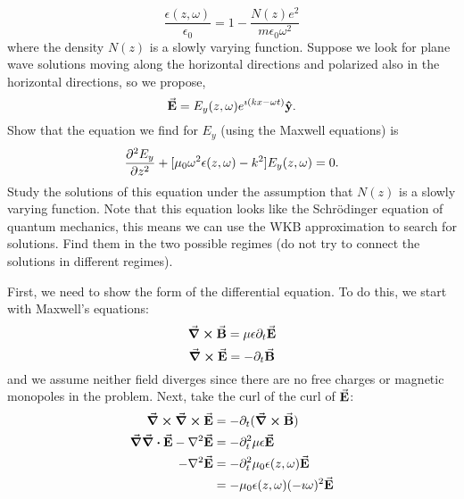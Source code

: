\documentclass[a4paper,twoside]{article}
\begin{document}
\begin{itemize}
        \begin{equation}
            \frac{\epsilon(z, \omega)}{\epsilon_0} = 1 - \frac{N(z) e^2}{m \epsilon_0 \omega^2}
        \end{equation}
        where the density $ N(z) $  is a slowly varying function. Suppose we look for plane wave solutions moving along the horizontal directions and polarized also in the horizontal directions, so we propose,
        \begin{equation}
            \va{E} = E_{y}(z, \omega) e^{\imath (kx - \omega t)} \vu{y}.
        \end{equation}
        Show that the equation we find for $ E_y $ (using the Maxwell equations) is
        \begin{equation}
            \pdv[2]{E_y}{z} + [\mu_0 \omega^2 \epsilon(z, \omega) - k^2] E_y(z, \omega) = 0.
        \end{equation}
        Study the solutions of this equation under the assumption that $ N(z) $ is a slowly varying function. Note that this equation looks like the Schr\"odinger equation of quantum mechanics, this means we can use the WKB approximation to search for solutions. Find them in the two possible regimes (do not try to connect the solutions in different regimes).
        \begin{problem}
            First, we need to show the form of the differential equation. To do this, we start with Maxwell's equations:
            \begin{equation}
                \curl{ \va{B}} = \mu \epsilon \partial_t \va{E}
            \end{equation}
            \begin{equation}
                \curl{ \va{E}} = - \partial_t \va{B}
            \end{equation}
            and we assume neither field diverges since there are no free charges or magnetic monopoles in the problem. Next, take the curl of the curl of $ \va{E} $:
            \begin{align}
                \curl{\curl{ \va{E}}} &= - \partial_t(\curl{ \va{B}}) \\
                \grad{\div{ \va{E}}} - \laplacian{ \va{E}} &= - \partial_t^2 \mu \epsilon \va{E} \\
                - \laplacian{ \va{E}} &= - \partial_t^2 \mu_0 \epsilon(z, \omega) \va{E} \\
                &= - \mu_0 \epsilon(z, \omega) (- \imath \omega)^2 \va{E} \\

\end{align}
\end{problem}
\end{itemize}
\end{document}
